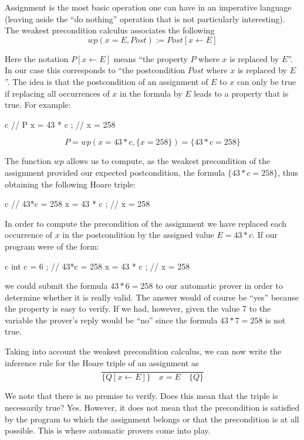 


Assignment is the most basic operation one can have in an imperative
language (leaving aside the ``do nothing'' operation that is not particularly
interesting). The weakest precondition calculus associates the following
$$wp(x = E , Post) := Post[x \leftarrow E]$$


Here the notation $P[x \leftarrow E]$ means ``the property $P$ where
$x$ is replaced by $E$''. In our case this corresponds to ``the
postcondition $Post$ where $x$ is replaced by $E$''. The idea is
that the postcondition of an assignment of $E$ to $x$ can only be
true if replacing all occurrences of $x$ in the formula by $E$ leads
to a property that is true. For example:



\begin{CodeBlock}{c}
// { P }
x = 43 * c ;
// { x = 258 }
\end{CodeBlock}


$$P = wp(x = 43*c , \{x = 258\}) = \{43*c = 258\}$$


The function $wp$ allows us to compute, as the weakest precondition of
the assignment provided our expected postcondition, the formula
$\{43*c = 258\}$, thus obtaining the following Hoare triple:


\begin{CodeBlock}{c}
// { 43*c = 258 }
x = 43 * c ;
// { x = 258 }
\end{CodeBlock}


In order to compute the precondition of the assignment we have replaced
each occurrence of $x$ in the postcondition by the assigned value
$E = 43*c$. If our program were of the form:
\begin{CodeBlock}{c}
int c = 6 ;
// { 43*c = 258 }
x = 43 * c ;
// { x = 258 }
\end{CodeBlock}
we could submit the formula $43*6 = 258$ to our automatic prover
in order to determine whether it is really valid. The answer would of
course be ``yes'' because the property is easy to verify. If we had,
however, given the value 7 to the variable  the prover's reply
would be ``no'' since the formula $43*7 = 258$ is not true.



Taking into account the weakest precondition calculus, we can now write
the inference rule for the Hoare triple of an assignment as
$$\dfrac{}{\{Q[x \leftarrow E] \}\quad x = E \quad\{ Q \}}$$


We note that there is no premise to verify. Does this mean that the
triple is necessarily true? Yes. However, it does not mean that the
precondition is satisfied by the program to which the assignment belongs
or that the precondition is at all possible. This is where automatic provers
come into play.



